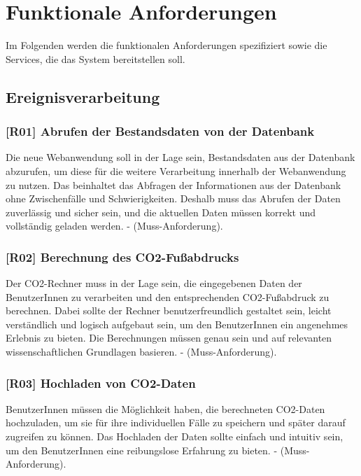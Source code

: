 \section{Funktionale Anforderungen}
\label{chapter:5-section:funktionale-anforderungen}

Im Folgenden werden die funktionalen Anforderungen spezifiziert sowie die Services, die das System bereitstellen soll.

\subsection{Ereignisverarbeitung}

\subsubsection{[R01] Abrufen der Bestandsdaten von der Datenbank}

Die neue Webanwendung soll in der Lage sein, Bestandsdaten aus der Datenbank abzurufen, um diese für die weitere Verarbeitung innerhalb der Webanwendung zu nutzen. Das beinhaltet das Abfragen der Informationen aus der Datenbank ohne Zwischenfälle und Schwierigkeiten. Deshalb muss das Abrufen der Daten zuverlässig und sicher sein, und die aktuellen Daten müssen korrekt und vollständig geladen werden. - (Muss-Anforderung).

\subsubsection{[R02] Berechnung des CO2-Fußabdrucks}
\label{sec:berechnung-des-co2abdrucks}

Der CO2-Rechner muss in der Lage sein, die eingegebenen Daten der BenutzerInnen zu verarbeiten und den entsprechenden CO2-Fußabdruck zu berechnen. Dabei sollte der Rechner benutzerfreundlich gestaltet sein, leicht verständlich und logisch aufgebaut sein, um den BenutzerInnen ein angenehmes Erlebnis zu bieten. Die Berechnungen müssen genau sein und auf relevanten wissenschaftlichen Grundlagen basieren. - (Muss-Anforderung).

\subsubsection{[R03] Hochladen von CO2-Daten}
\label{sec:hochladen-von-co2daten}

BenutzerInnen müssen die Möglichkeit haben, die berechneten CO2-Daten hochzuladen, um sie für ihre individuellen Fälle zu speichern und später darauf zugreifen zu können. Das Hochladen der Daten sollte einfach und intuitiv sein, um den BenutzerInnen eine reibungslose Erfahrung zu bieten. - (Muss-Anforderung).

